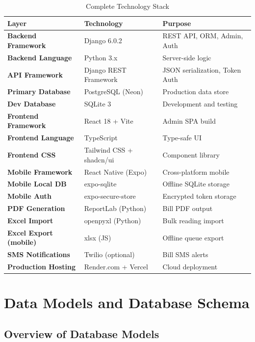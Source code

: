 \documentclass[12pt, a4paper]{report}
\begin{document}
\begin{table}[H]
\centering
\caption{Complete Technology Stack}
\begin{tabularx}{\textwidth}{>{\bfseries}l l X}
\toprule
\textbf{Layer} & \textbf{Technology} & \textbf{Purpose} \\
\midrule
Backend Framework & Django 6.0.2 & REST API, ORM, Admin, Auth \\
Backend Language & Python 3.x & Server-side logic \\
API Framework & Django REST Framework & JSON serialization, Token Auth \\
Primary Database & PostgreSQL (Neon) & Production data store \\
Dev Database & SQLite 3 & Development and testing \\
Frontend Framework & React 18 + Vite & Admin SPA build \\
Frontend Language & TypeScript & Type-safe UI \\
Frontend CSS & Tailwind CSS + shadcn/ui & Component library \\
Mobile Framework & React Native (Expo) & Cross-platform mobile \\
Mobile Local DB & expo-sqlite & Offline SQLite storage \\
Mobile Auth & expo-secure-store & Encrypted token storage \\
PDF Generation & ReportLab (Python) & Bill PDF output \\
Excel Import & openpyxl (Python) & Bulk reading import \\
Excel Export (mobile) & xlsx (JS) & Offline queue export \\
SMS Notifications & Twilio (optional) & Bill SMS alerts \\
Production Hosting & Render.com + Vercel & Cloud deployment \\
\bottomrule
\end{tabularx}
\end{table}

\chapter{Data Models and Database Schema}

\section{Overview of Database Models}
\end{document}
